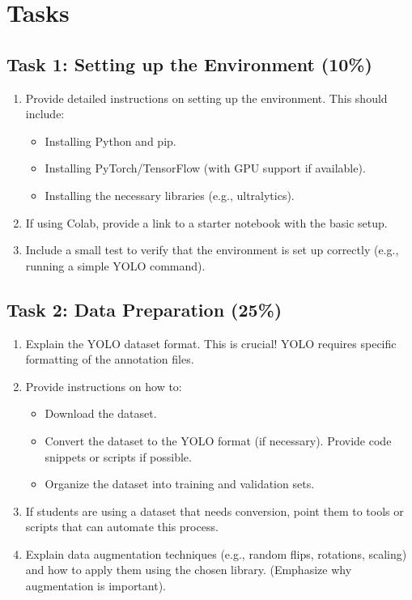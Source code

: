 \documentclass[11pt]{article}
\begin{document}
\section{Tasks}
\label{sec:org3f35c6e}
\subsection{Task 1: Setting up the Environment (10\%)}
\label{sec:orgf0d521a}
\begin{enumerate}
\item Provide detailed instructions on setting up the
environment. This should include:
\begin{itemize}
\item Installing Python and pip.
\item Installing PyTorch/TensorFlow (with GPU support if
available).
\item Installing the necessary libraries (e.g.,
ultralytics).
\end{itemize}
\item If using Colab, provide a link to a starter notebook
with the basic setup.
\item Include a small test to verify that the environment
is set up correctly (e.g., running a simple YOLO
command).
\end{enumerate}
\subsection{Task 2: Data Preparation (25\%)}
\label{sec:org303a035}
\begin{enumerate}
\item Explain the YOLO dataset format. This is crucial!
YOLO requires specific formatting of the annotation
files.
\item Provide instructions on how to:
\begin{itemize}
\item Download the dataset.
\item Convert the dataset to the YOLO format (if
necessary). Provide code snippets or scripts if
possible.
\item Organize the dataset into training and validation
sets.
\end{itemize}
\item If students are using a dataset that needs
conversion, point them to tools or scripts that can
automate this process.
\item Explain data augmentation techniques (e.g., random
flips, rotations, scaling) and how to apply them
using the chosen library. (Emphasize why
augmentation is important).
\end{enumerate}
\end{document}
